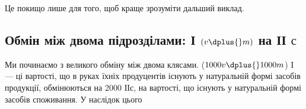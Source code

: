 Це покищо лише для того, щоб краще зрозуміти дальший виклад.
\label{original-305-1}

\subsection[Обмін між двома підрозділами]{Обмін
між двома підрозділами: І $(v \dplus{} m)$ на ІІ $с$\footnotemark{}}

\label{original-305-2}

\noindent{}Ми починаємо з великого обміну між двома клясами. ($1000v \dplus{}
1000m$) І — ці вартості, що в руках їхніх продуцентів існують у натуральній
формі засобів продукції, обмінюються на 2000 ІІс, на вартості,
що існують у натуральній формі засобів споживання. У наслідок цього
\parbreak{}  %

